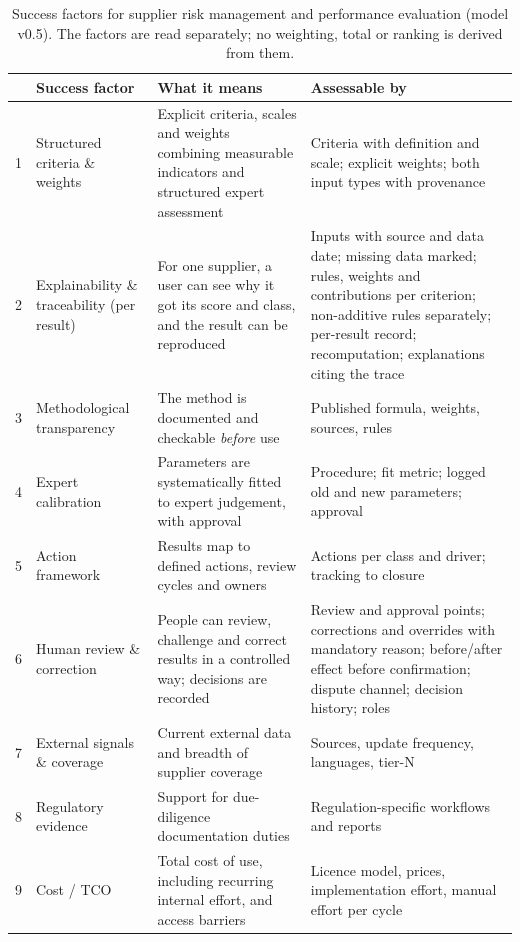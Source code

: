\documentclass[10pt,twocolumn,a4paper]{article}
\newcommand{\dimhead}[1]{\textbf{#1}}
\begin{document}
\begin{table}[t]
  \caption{Success factors for supplier risk management and performance evaluation (model
  v0.5). The factors are
  read separately; no weighting, total or ranking is derived from them.}
  \label{tab:factors}
  \small
  \begin{tabular}{@{}P{0.02\textwidth}P{0.20\textwidth}P{0.345\textwidth}P{0.345\textwidth}@{}}
    \toprule
    & \dimhead{Success factor} & \dimhead{What it means} & \dimhead{Assessable by} \\
     & Structured criteria \& weights & Explicit criteria, scales and weights combining measurable indicators and structured expert assessment & Criteria with definition and scale; explicit weights; both input types with provenance \\
    2 & Explainability \& traceability (per result) & For one supplier, a user can see why it got its score and class, and the result can be reproduced & Inputs with source and data date; missing data marked; rules, weights and contributions per criterion; non-additive rules separately; per-result record; recomputation; explanations citing the trace \\
    3 & Methodological transparency & The method is documented and checkable \emph{before} use & Published formula, weights, sources, rules \\
    4 & Expert calibration & Parameters are systematically fitted to expert judgement, with approval & Procedure; fit metric; logged old and new parameters; approval \\
    5 & Action framework & Results map to defined actions, review cycles and owners & Actions per class and driver; tracking to closure \\
    6 & Human review \& correction & People can review, challenge and correct results in a controlled way; decisions are recorded & Review and approval points; corrections and overrides with mandatory reason; before/after effect before confirmation; dispute channel; decision history; roles \\
    7 & External signals \& coverage & Current external data and breadth of supplier coverage & Sources, update frequency, languages, tier-N \\
    8 & Regulatory evidence & Support for due-diligence documentation duties & Regulation-specific workflows and reports \\
    9 & Cost / TCO & Total cost of use, including recurring internal effort, and access barriers & Licence model, prices, implementation effort, manual effort per cycle \\

\end{tabular}
\end{table}
\end{document}
